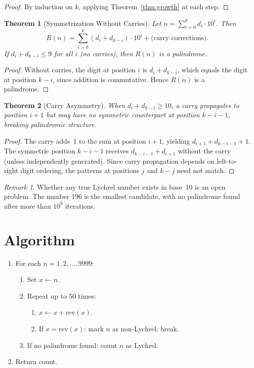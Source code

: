 \documentclass[12pt]{article}
\newtheorem{theorem}{Theorem}
\theoremstyle{definition}
\theoremstyle{remark}
\newtheorem*{remark}{Remark}
\begin{document}
\begin{proof}
By induction on $k$, applying Theorem~\ref{thm:growth} at each step.
\end{proof}

\begin{theorem}[Symmetrization Without Carries]
\label{thm:nocarry}
Let $n = \sum_{i=0}^{k} d_i \cdot 10^i$. Then
\[
R(n) = \sum_{i=0}^{k} (d_i + d_{k-i}) \cdot 10^i + \text{(carry corrections)}.
\]
If $d_i + d_{k-i} \leq 9$ for all $i$ (no carries), then $R(n)$ is a palindrome.
\end{theorem}

\begin{proof}
Without carries, the digit at position $i$ is $d_i + d_{k-i}$, which equals the digit at position $k - i$, since addition is commutative. Hence $R(n)$ is a palindrome.
\end{proof}

\begin{theorem}[Carry Asymmetry]
When $d_i + d_{k-i} \geq 10$, a carry propagates to position $i + 1$ but may have no symmetric counterpart at position $k - i - 1$, breaking palindromic structure.
\end{theorem}

\begin{proof}
The carry adds~1 to the sum at position $i + 1$, yielding $d_{i+1} + d_{k-i-1} + 1$. The symmetric position $k - i - 1$ receives $d_{k-i-1} + d_{i+1}$ without the carry (unless independently generated). Since carry propagation depends on left-to-right digit ordering, the patterns at positions $j$ and $k - j$ need not match.
\end{proof}

\begin{remark}
Whether any true Lychrel number exists in base~10 is an open problem. The number 196 is the smallest candidate, with no palindrome found after more than $10^9$ iterations.
\end{remark}

\section{Algorithm}

\begin{enumerate}
    \item For each $n = 1, 2, \ldots, 9999$:
    \begin{enumerate}
        \item Set $x \leftarrow n$.
        \item Repeat up to 50 times:
        \begin{enumerate}
            \item $x \leftarrow x + \mathrm{rev}(x)$.
            \item If $x = \mathrm{rev}(x)$: mark $n$ as non-Lychrel; break.
        \end{enumerate}
        \item If no palindrome found: count $n$ as Lychrel.
    \end{enumerate}
    \item Return count.
\end{enumerate}
\end{document}
